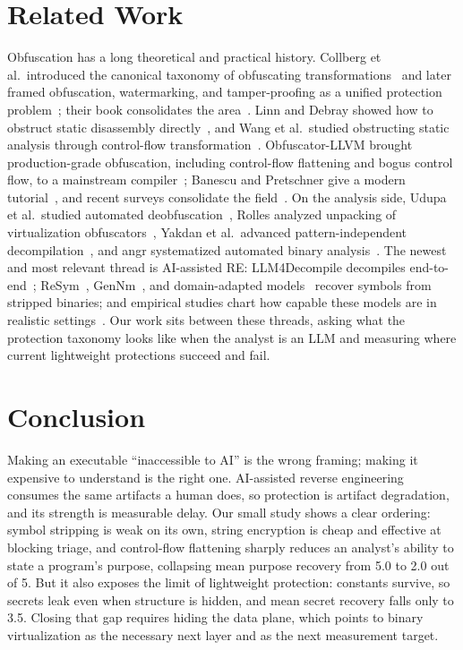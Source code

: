 \documentclass[conference]{IEEEtran}
\begin{document}
\section{Related Work}
Obfuscation has a long theoretical and practical history. Collberg et al.\
introduced the canonical taxonomy of obfuscating
transformations~\cite{obf-taxonomy} and later framed obfuscation, watermarking,
and tamper-proofing as a unified protection problem~\cite{collberg-tse}; their
book consolidates the area~\cite{surreptitious}. Linn and Debray showed how to
obstruct static disassembly directly~\cite{linn-debray}, and Wang et al.\ studied
obstructing static analysis through control-flow
transformation~\cite{wang-tamper}. Obfuscator-LLVM brought production-grade
obfuscation, including control-flow flattening and bogus control flow, to a
mainstream compiler~\cite{ollvm}; Banescu and Pretschner give a modern
tutorial~\cite{banescu}, and recent surveys consolidate the
field~\cite{protecting-survey}. On the analysis side, Udupa et al.\ studied
automated deobfuscation~\cite{udupa}, Rolles analyzed unpacking of
virtualization obfuscators~\cite{rolles}, Yakdan et al.\ advanced
pattern-independent decompilation~\cite{nomoregotos}, and angr systematized
automated binary analysis~\cite{angr}. The newest and most relevant thread is
AI-assisted RE: LLM4Decompile decompiles end-to-end~\cite{llm4decompile};
ReSym~\cite{resym}, GenNm~\cite{gennm}, and domain-adapted models~\cite{funcname}
recover symbols from stripped binaries; and empirical studies chart how capable
these models are in realistic settings~\cite{howfar,empirical}. Our work sits
between these threads, asking what the protection taxonomy looks like when the
analyst is an LLM and measuring where current lightweight protections succeed and
fail.

\section{Conclusion}
Making an executable ``inaccessible to AI'' is the wrong framing; making it
expensive to understand is the right one. AI-assisted reverse engineering
consumes the same artifacts a human does, so protection is artifact degradation,
and its strength is measurable delay. Our small study shows a clear ordering:
symbol stripping is weak on its own, string encryption is cheap and effective at
blocking triage, and control-flow flattening sharply reduces an analyst's ability
to state a program's purpose, collapsing mean purpose recovery from 5.0 to 2.0 out
of 5. But it also exposes the limit of lightweight protection: constants survive,
so secrets leak even when structure is hidden, and mean secret recovery falls only
to 3.5. Closing that gap requires hiding the data plane, which points to binary
virtualization as the necessary next layer and as the next measurement target.
\end{document}
